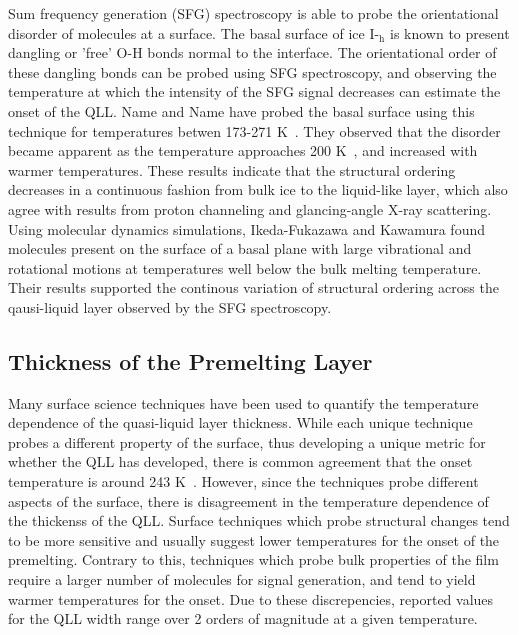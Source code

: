 Sum frequency generation (SFG) spectroscopy is able to probe the
orientational disorder of molecules at a surface. The basal surface of
ice I-$_\mathrm{h}$ is known to present dangling or 'free' O-H bonds
normal to the interface. The orientational order of these dangling
bonds can be probed using SFG spectroscopy, and observing the
temperature at which the intensity of the SFG signal decreases can
estimate the onset of the QLL. Name and Name have probed the basal
surface using this technique for temperatures betwen 173-271
K~.\cite{Wei01,Wei02} They observed that the disorder became apparent
as the temperature approaches 200 K~, and increased with warmer
temperatures.  These results indicate that the structural ordering
decreases in a continuous fashion from bulk ice to the liquid-like
layer, which also agree with results from proton channeling and
glancing-angle X-ray scattering.\cite{Golecki78,Dosch95} Using
molecular dynamics simulations, Ikeda-Fukazawa and Kawamura found
molecules present on the surface of a basal plane with large
vibrational and rotational motions at temperatures well below the bulk
melting temperature.\cite{Ikeda-Fukazawa04} Their results supported
the continous variation of structural ordering across the qausi-liquid
layer observed by the SFG spectroscopy.

\subsection{Thickness of the Premelting Layer}
Many surface science techniques have been used to quantify the
temperature dependence of the quasi-liquid layer
thickness.\cite{Kouchi87,Golecki78,Dosch95,Beaglehole80, Bluhm99,
  Bluhm02, Furukawa87, Elbaum93, Dosch96, Doppenschmidt00, Kaverin04,
  Lied94} While each unique technique probes a different property of
the surface, thus developing a unique metric for whether the QLL has
developed, there is common agreement that the onset temperature is
around 243 K~. However, since the techniques probe different aspects
of the surface, there is disagreement in the temperature dependence of
the thickenss of the QLL. Surface techniques which probe structural
changes tend to be more sensitive and usually suggest lower
temperatures for the onset of the premelting. Contrary to this,
techniques which probe bulk properties of the film require a larger
number of molecules for signal generation, and tend to yield warmer
temperatures for the onset. Due to these discrepencies, reported
values for the QLL width range over 2 orders of magnitude at a given
temperature.\cite{Rosenberg05,Dosch96}

